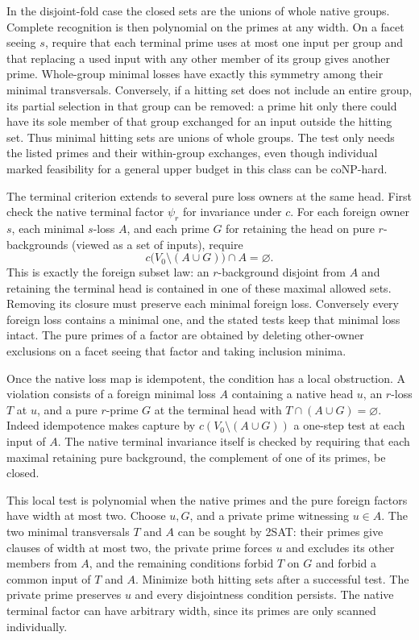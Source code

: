 In the disjoint-fold case the closed sets are the unions
of whole native groups. Complete recognition is then
polynomial on the primes at any width. On a facet seeing
$s$, require that each terminal prime uses at most one
input per group and that replacing a used input with any
other member of its group gives another prime. Whole-group
minimal losses have exactly this symmetry among their
minimal transversals. Conversely, if a hitting set does
not include an entire group, its partial selection in
that group can be removed: a prime hit only there could
have its sole member of that group exchanged for an
input outside the hitting set. Thus minimal hitting sets
are unions of whole groups. The test only needs the
listed primes and their within-group exchanges, even
though individual marked feasibility for a general
upper budget in this class can be coNP-hard.

The terminal criterion extends to several pure loss
owners at the same head. First check the native terminal
factor $\psi_r$ for invariance under $c$. For each
foreign owner $s$, each minimal $s$-loss $A$, and each
prime $G$ for retaining the head on pure $r$-backgrounds
(viewed as a set of inputs), require
\[
             c\bigl(V_0\setminus(A\cup G)\bigr)\cap A=\varnothing.
\]
This is exactly the foreign subset law: an $r$-background
disjoint from $A$ and retaining the terminal head is
contained in one of these maximal allowed sets. Removing
its closure must preserve each minimal foreign loss.
Conversely every foreign loss contains a minimal one,
and the stated tests keep that minimal loss intact.
The pure primes of a factor are obtained by deleting
other-owner exclusions on a facet seeing that factor
and taking inclusion minima.

Once the native loss map is idempotent, the condition
has a local obstruction. A violation consists of a
foreign minimal loss $A$ containing a native head $u$,
an $r$-loss $T$ at $u$, and a pure $r$-prime $G$ at the
terminal head with $T\cap(A\cup G)=\varnothing$.
Indeed idempotence makes capture by
$c(V_0\setminus(A\cup G))$ a one-step test at each input
of $A$. The native terminal invariance itself is checked
by requiring that each maximal retaining pure background,
the complement of one of its primes, be closed.

This local test is polynomial when the native primes
and the pure foreign factors have width at most two.
Choose $u,G$, and a private prime witnessing $u\in A$.
The two minimal transversals $T$ and $A$ can be sought
by 2SAT: their primes give clauses of width at most two,
the private prime forces $u$ and excludes its other
members from $A$, and the remaining conditions forbid
$T$ on $G$ and forbid a common input of $T$ and $A$.
Minimize both hitting sets after a successful test.
The private prime preserves $u$ and every disjointness
condition persists. The native terminal factor can
have arbitrary width, since its primes are only scanned
individually.

